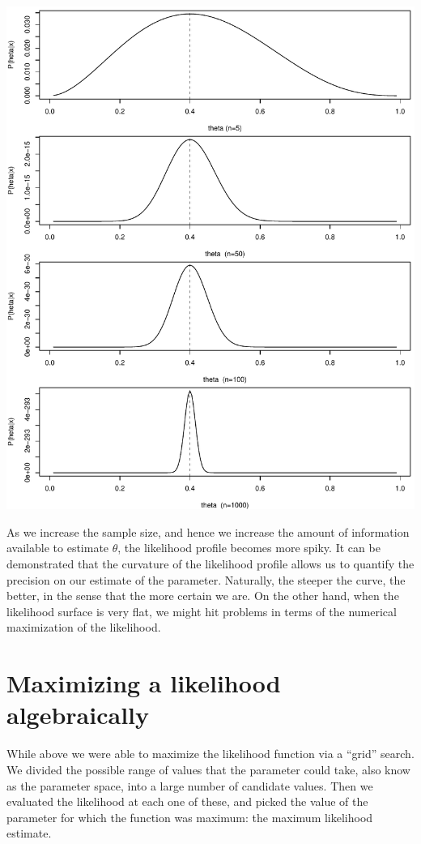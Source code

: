 \documentclass[
]{book}
\begin{document}
\includegraphics{ECOMODbook_files/figure-latex/ch13.4-1.pdf}

As we increase the sample size, and hence we increase the amount of information available to estimate \(\theta\), the likelihood profile becomes more spiky. It can be demonstrated that the curvature of the likelihood profile allows us to quantify the precision on our estimate of the parameter. Naturally, the steeper the curve, the better, in the sense that the more certain we are. On the other hand, when the likelihood surface is very flat, we might hit problems in terms of the numerical maximization of the likelihood.

\hypertarget{maximizing-a-likelihood-algebraically}{%
\section{Maximizing a likelihood algebraically}\label{maximizing-a-likelihood-algebraically}}

While above we were able to maximize the likelihood function via a ``grid'' search. We divided the possible range of values that the parameter could take, also know as the parameter space, into a large number of candidate values. Then we evaluated the likelihood at each one of these, and picked the value of the parameter for which the function was maximum: the maximum likelihood estimate.
\end{document}

